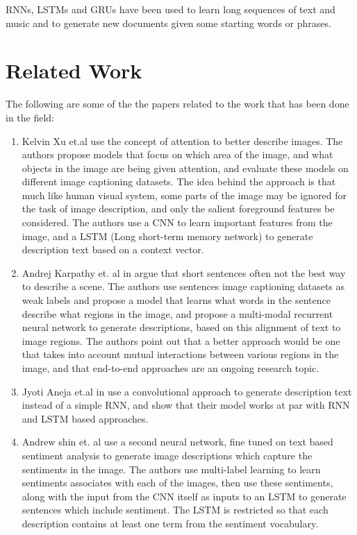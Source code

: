 \documentclass[a4paper]{article}
\begin{document}
RNNs, LSTMs and GRUs have been used to learn long sequences of text and music and to generate new documents given some starting words or phrases\cite{karpathy-rnn}.

\section{Related Work}
The following are some of the the papers related to the work that has been done in the field:
\begin{enumerate}
\item Kelvin Xu et.al \cite{image-cap-visual-attn} use the concept of attention to better describe images. The authors propose models that focus on which area of the image, and what objects in the image are being given attention, and evaluate these models on different image captioning datasets. The idea behind the approach is that much like human visual system, some parts of the image may be ignored for the task of image description, and only the salient foreground features be considered. The authors use a CNN to learn 
important features from the image, and a LSTM (Long short-term memory network) to generate description text based on a context vector.

\item Andrej Karpathy et. al in \cite{karpathy-deep-visial-semantic} argue that short sentences often not the best way to describe a scene. The authors use sentences image captioning datasets as weak labels and propose a model that learns what words in the sentence describe what regions in the image, and propose a multi-modal recurrent neural network to generate descriptions, based on this alignment of text to image regions. The authors point out that a better approach would be one that takes into account mutual interactions between various regions in the image, and that end-to-end approaches are an ongoing research topic.

\item Jyoti Aneja et.al in \cite{convolutional-image-capitioning} use a convolutional approach to generate description text instead of a simple RNN, and show that their model works at par with RNN and LSTM based approaches.

\item Andrew shin et. al \cite{Image-cap-sentiment-weakly-supervised} use a second neural network, fine tuned on text based sentiment analysis to generate image descriptions which capture the sentiments in the image. The authors use multi-label learning to learn sentiments associates with each of the images, then use these sentiments, along with the input from the CNN itself as inputs to an LSTM to generate sentences which include sentiment. The LSTM is restricted so that each description contains at least one term from the sentiment vocabulary.


\end{enumerate}
\end{document}
